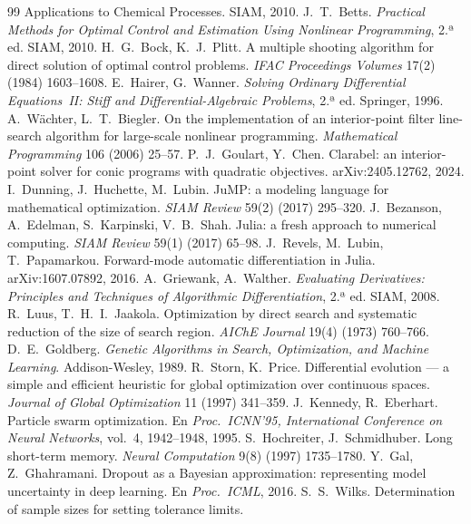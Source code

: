 \documentclass[11pt,a4paper]{article}
\theoremstyle{plain}
\theoremstyle{definition}
\begin{document}
\begin{thebibliography}{99}
{  Applications to Chemical Processes}. SIAM, 2010.
 J.~T.~Betts. \emph{Practical Methods for Optimal Control and Estimation
  Using Nonlinear Programming}, 2.ª ed. SIAM, 2010.
 H.~G.~Bock, K.~J.~Plitt. A multiple shooting algorithm for direct solution of
  optimal control problems. \emph{IFAC Proceedings Volumes} 17(2) (1984) 1603--1608.
 E.~Hairer, G.~Wanner. \emph{Solving Ordinary Differential Equations~II:
  Stiff and Differential-Algebraic Problems}, 2.ª ed. Springer, 1996.
 A.~Wächter, L.~T.~Biegler. On the implementation of an interior-point
  filter line-search algorithm for large-scale nonlinear programming. \emph{Mathematical
  Programming} 106 (2006) 25--57.
 P.~J.~Goulart, Y.~Chen. Clarabel: an interior-point solver for conic
  programs with quadratic objectives. arXiv:2405.12762, 2024.
 I.~Dunning, J.~Huchette, M.~Lubin. JuMP: a modeling language for
  mathematical optimization. \emph{SIAM Review} 59(2) (2017) 295--320.
 J.~Bezanson, A.~Edelman, S.~Karpinski, V.~B.~Shah. Julia: a fresh approach
  to numerical computing. \emph{SIAM Review} 59(1) (2017) 65--98.
 J.~Revels, M.~Lubin, T.~Papamarkou. Forward-mode automatic differentiation
  in Julia. arXiv:1607.07892, 2016.
 A.~Griewank, A.~Walther. \emph{Evaluating Derivatives: Principles and
  Techniques of Algorithmic Differentiation}, 2.ª ed. SIAM, 2008.
 R.~Luus, T.~H.~I.~Jaakola. Optimization by direct search and systematic
  reduction of the size of search region. \emph{AIChE Journal} 19(4) (1973) 760--766.
 D.~E.~Goldberg. \emph{Genetic Algorithms in Search, Optimization, and
  Machine Learning}. Addison-Wesley, 1989.
 R.~Storn, K.~Price. Differential evolution --- a simple and efficient
  heuristic for global optimization over continuous spaces. \emph{Journal of Global
  Optimization} 11 (1997) 341--359.
 J.~Kennedy, R.~Eberhart. Particle swarm optimization. En \emph{Proc.\
  ICNN'95, International Conference on Neural Networks}, vol.~4, 1942--1948, 1995.
\bibitem{hochreiter1997} S.~Hochreiter, J.~Schmidhuber. Long short-term memory. \emph{Neural
  Computation} 9(8) (1997) 1735--1780.
 Y.~Gal, Z.~Ghahramani. Dropout as a Bayesian approximation: representing model
  uncertainty in deep learning. En \emph{Proc.\ ICML}, 2016.
 S.~S.~Wilks. Determination of sample sizes for setting tolerance limits.

\end{thebibliography}
\end{document}
